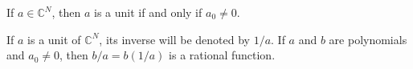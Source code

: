 If $a \in \mathbb{C}^N$, then $a$ is a unit if and only if $a_0 \neq 0$.

If $a$ is a unit of $\mathbb{C}^N$, its inverse will be denoted by $1/a$. If $a$ and $b$ are polynomials and $a_0 \neq 0$, then $b/a = b(1/a)$ is a rational function.
